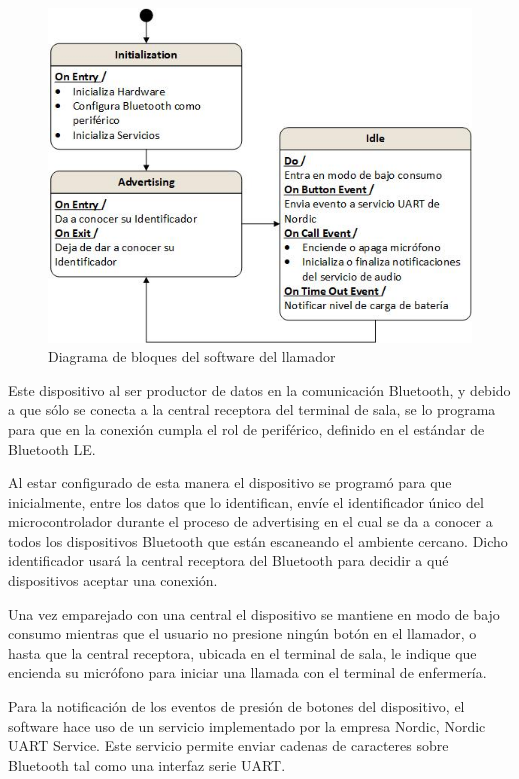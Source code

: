 \begin{figure}[htpb]
	\centering
	\includegraphics[scale=0.8]{./Figures/DCaller.jpeg}
	\caption{Diagrama de bloques del software del llamador}
	\label{fig:DiagramaSoftLlam}
\end{figure}

Este dispositivo al ser productor de datos en la comunicación Bluetooth, y debido a que sólo se conecta a la central receptora del terminal de sala, se lo programa para que en la conexión cumpla el rol de periférico, definido en el estándar de Bluetooth LE. 

Al estar configurado de esta manera el dispositivo se programó para que inicialmente, entre los datos que lo identifican, envíe el identificador único del microcontrolador durante el proceso de advertising en el cual se da a conocer a todos los dispositivos Bluetooth que están escaneando el ambiente cercano. Dicho identificador usará la central receptora del Bluetooth para decidir a qué dispositivos aceptar una conexión.

Una vez emparejado con una central el dispositivo se mantiene en modo de bajo consumo mientras que el usuario no presione ningún botón en el llamador, o hasta que la central receptora, ubicada en el terminal de sala, le indique que encienda su micrófono para iniciar una llamada con el terminal de enfermería.

Para la notificación de los eventos de presión de botones del dispositivo, el software hace uso de un servicio implementado por la empresa Nordic, Nordic UART Service. Este servicio permite enviar cadenas de caracteres sobre Bluetooth tal como una interfaz serie UART.

